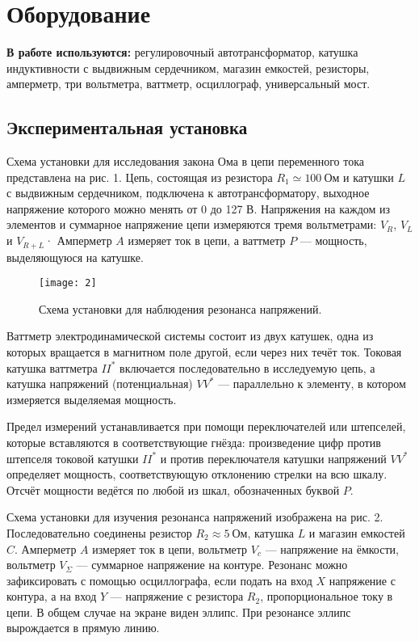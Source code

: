 \section{Оборудование}
\textbf{В работе используются:}
регулировочный автотрансформатор,
катушка индуктивности с выдвижным
сердечником, магазин емкостей,
резисторы, амперметр, три вольтметра,
ваттметр, осциллограф, универсальный
мост.
\subsection*{Экспериментальная установка}
Схема установки для исследования закона
Ома в цепи переменного тока представлена
на рис. 1. Цепь, состоящая из резистора
$R_1 \simeq 100\ \text{Ом}$ и катушки $L$ с выдвижным
сердечником, подключена к
автотрансформатору, выходное напряжение
которого можно менять от 0 до 127 В.
Напряжения на каждом из элементов и
суммарное напряжение цепи измеряются
тремя вольтметрами: $V_R$, $V_L$ и
$V_{R+L}$·
Амперметр $A$ измеряет ток в цепи, а
ваттметр $P$ — мощность, выделяющуюся на
катушке.

\begin{wrapfigure}[20]{r}{0.5\linewidth}
    \vspace{3ex}
    \texttt{[image: 2]}
    \captionsetup{justification=centering}
    \caption{Схема установки для
    наблюдения резонанса напряжений.}
\end{wrapfigure}

Ваттметр электродинамической системы
состоит из двух катушек, одна из которых
вращается в магнитном поле другой, если
через них течёт ток. Токовая катушка
ваттметра $II^*$ включается последовательно
в исследуемую цепь, а катушка напряжений
(потенциальная) $VV^*$ — параллельно к
элементу, в котором измеряется
выделяемая мощность.

Предел измерений
устанавливается при помощи
переключателей или штепселей, которые
вставляются в соответствующие гнёзда:
произведение цифр против штепселя
токовой катушки $II^*$ и против
переключателя катушки напряжений $VV^*$
определяет мощность, соответствующую
отклонению стрелки на всю шкалу. Отсчёт
мощности ведётся по любой из шкал,
обозначенных буквой $P$.

Схема установки для изучения резонанса
напряжений изображена на рис. 2.
Последовательно соединены резистор $R_2
\approx 5\ \text{Ом}$, катушка $L$ и
магазин емкостей $C$.
Амперметр $A$ измеряет ток в цепи,
вольтметр $V_c$ — напряжение на ёмкости,
вольтметр $V_\Sigma$ — суммарное напряжение на
контуре. Резонанс можно зафиксировать с
помощью осциллографа, если подать на
вход $X$ напряжение с контура, а на вход
$Y$ — напряжение с резистора $R_2$,
пропорциональное току в цепи. В общем
случае на экране виден эллипс. При
резонансе эллипс вырождается в прямую
линию.

